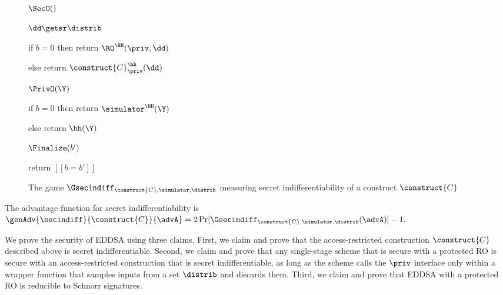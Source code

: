 \begin{figure}

{
	\begin{algorithm}{$\SecO()$}
		\item $\dd \getsr \distrib$
		\item if $b = 0$ then return $\RO^{\HH}(\priv, \dd)$
		\item else return $\construct{C}^{\hh}_{\priv}(\dd)$
	\end{algorithm}
	\ExptSepSpace
	\begin{algorithm}{$\PrivO(\Y)$}
		\item if $b = 0$ then return $\simulator^{\HH}(\Y)$
		\item else return $\hh(\Y)$
	\end{algorithm}
	\ExptSepSpace
	\begin{algorithm}{$\Finalize(b')$}
		\item return $[[b = b']]$
	\end{algorithm}
}
	\vspace{5pt}
	\caption{The game  $\Gsecindiff_{\construct{C}, \simulator, \distrib}$ measuring secret indifferentiability of a construct $\construct{C}$}
	\label{fig-game-sec-indiff}
\end{figure}

The advantage function for secret indifferentiability is $\genAdv{\secindiff}{\construct{C}}{\advA} = 2\Pr[ \Gsecindiff_{\construct{C}, \simulator, \distrib}(\advA)] -1.$ 


We prove the security of EDDSA using three claims.
First, we claim and prove that the access-restricted construction $\construct{C}$ described above is secret indifferentiable.
Second, we claim and prove that any single-stage scheme that is secure with a protected RO is secure with an access-restricted construction that is secret indifferentiable, as long as the scheme calls the $\priv$ interface only within a wrapper function that samples inputs from a set $\distrib$ and discards them.
Third, we claim and prove that EDDSA with a protected RO is reducible to Schnorr signatures.

